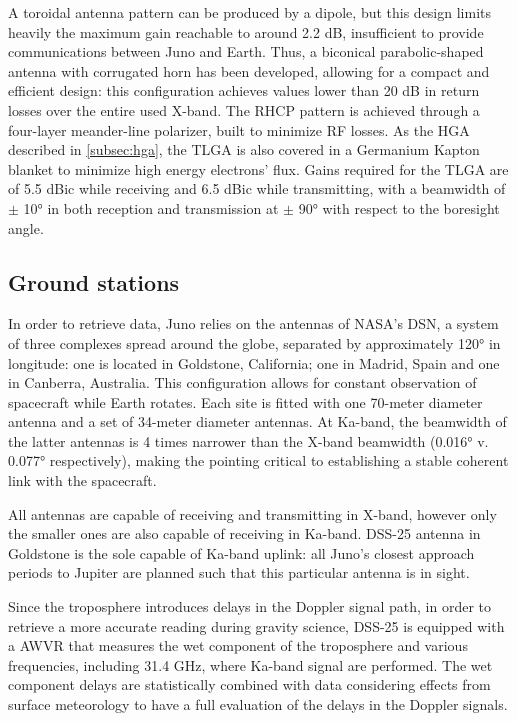 A toroidal antenna pattern can be produced by a dipole, but this design limits heavily the maximum gain reachable to around 2.2 dB, insufficient to provide communications between Juno and Earth. Thus, a biconical parabolic-shaped antenna with corrugated horn has been developed, allowing for a compact and efficient design: this configuration achieves values lower than 20 dB in return losses over the entire used X-band\cite{telecommunication_antennas}. 
The RHCP pattern is achieved through a four-layer meander-line polarizer, built to minimize RF losses.  As the HGA described in \autoref{subsec:hga}, the TLGA is also covered in a Germanium Kapton blanket to minimize high energy electrons' flux. Gains required for the TLGA are of 5.5 dBic while receiving and 6.5 dBic while transmitting, with a beamwidth of $\pm$ 10° in both reception and transmission at $\pm$ 90° with respect to the boresight angle\cite{juno_telecommunication}. 

\subsection{Ground stations}
\label{subsec:gs}

In order to retrieve data, Juno relies on the antennas of NASA's DSN, a system of three complexes spread around the globe, separated by approximately 120° in longitude: one is located in Goldstone, California; one in Madrid, Spain and one in Canberra, Australia. This configuration allows for constant observation of spacecraft while Earth rotates\cite{juno_telecommunication}. Each site is fitted with one 70-meter diameter antenna and a set of 34-meter diameter antennas. At Ka-band, the beamwidth of the latter antennas is 4 times narrower than the X-band beamwidth (0.016° v. 0.077° respectively), making the pointing critical to establishing a stable coherent link with the spacecraft. 

All antennas are capable of receiving and transmitting in X-band, however only the smaller ones are also capable of receiving in Ka-band. DSS-25 antenna in Goldstone is the sole capable of Ka-band uplink: all Juno's closest approach periods to Jupiter are planned such that this particular antenna is in sight.

Since the troposphere introduces delays in the Doppler signal path, in order to retrieve a more accurate reading during gravity science, DSS-25 is equipped with a AWVR that measures the wet component of the troposphere and various frequencies, including 31.4 GHz, where Ka-band signal are performed. The wet component delays are statistically combined with data considering effects from surface meteorology to have a full evaluation of the delays in the Doppler signals\cite{calibration_performance}.

